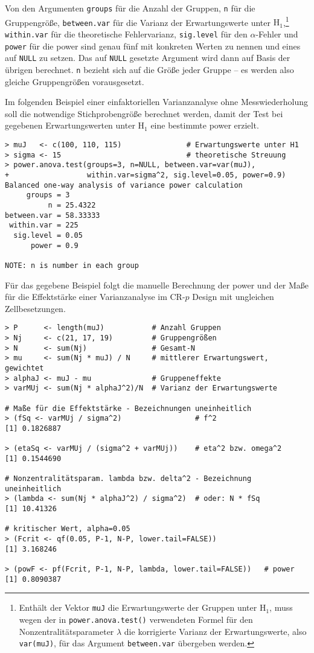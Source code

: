 Von den Argumenten \lstinline!groups! für die Anzahl der Gruppen, \lstinline!n! für die Gruppengröße, \lstinline!between.var! für die Varianz der Erwartungswerte unter $\text{H}_{1}$,\footnote{Enthält der Vektor \lstinline!muJ! die Erwartungswerte der Gruppen unter $\text{H}_{1}$, muss wegen der in \lstinline!power.anova.test()! verwendeten Formel für den Nonzentralitätsparameter $\lambda$ die korrigierte Varianz der Erwartungswerte, also \lstinline!var(muJ)!, für das Argument \lstinline!between.var! übergeben werden.} \lstinline!within.var! für die theoretische Fehlervarianz, \lstinline!sig.level! für den $\alpha$-Fehler und \lstinline!power! für die power sind genau fünf mit konkreten Werten zu nennen und eines auf \lstinline!NULL! zu setzen. Das auf \lstinline!NULL! gesetzte Argument wird dann auf Basis der übrigen berechnet. \lstinline!n! bezieht sich auf die Größe jeder Gruppe -- es werden also gleiche Gruppengrößen vorausgesetzt.

Im folgenden Beispiel einer einfaktoriellen Varianzanalyse ohne Messwiederholung soll die notwendige Stichprobengröße berechnet werden, damit der Test bei gegebenen Erwartungswerten unter $\text{H}_{1}$ eine bestimmte power erzielt.
\begin{lstlisting}
> muJ   <- c(100, 110, 115)               # Erwartungswerte unter H1
> sigma <- 15                             # theoretische Streuung
> power.anova.test(groups=3, n=NULL, between.var=var(muJ),
+                  within.var=sigma^2, sig.level=0.05, power=0.9)
Balanced one-way analysis of variance power calculation
     groups = 3
          n = 25.4322
between.var = 58.33333
 within.var = 225
  sig.level = 0.05
      power = 0.9

NOTE: n is number in each group
\end{lstlisting}

Für das gegebene Beispiel folgt die manuelle Berechnung der power und der Maße für die Effektstärke einer Varianzanalyse im CR-$p$ Design mit ungleichen Zellbesetzungen.
\begin{lstlisting}
> P      <- length(muJ)           # Anzahl Gruppen
> Nj     <- c(21, 17, 19)         # Gruppengrößen
> N      <- sum(Nj)               # Gesamt-N
> mu     <- sum(Nj * muJ) / N     # mittlerer Erwartungswert, gewichtet
> alphaJ <- muJ - mu              # Gruppeneffekte
> varMUj <- sum(Nj * alphaJ^2)/N  # Varianz der Erwartungswerte

# Maße für die Effektstärke - Bezeichnungen uneinheitlich
> (fSq <- varMUj / sigma^2)                 # f^2
[1] 0.1826887

> (etaSq <- varMUj / (sigma^2 + varMUj))    # eta^2 bzw. omega^2
[1] 0.1544690

# Nonzentralitätsparam. lambda bzw. delta^2 - Bezeichnung uneinheitlich
> (lambda <- sum(Nj * alphaJ^2) / sigma^2)  # oder: N * fSq
[1] 10.41326

# kritischer Wert, alpha=0.05
> (Fcrit <- qf(0.05, P-1, N-P, lower.tail=FALSE))
[1] 3.168246

> (powF <- pf(Fcrit, P-1, N-P, lambda, lower.tail=FALSE))   # power
[1] 0.8090387
\end{lstlisting}

